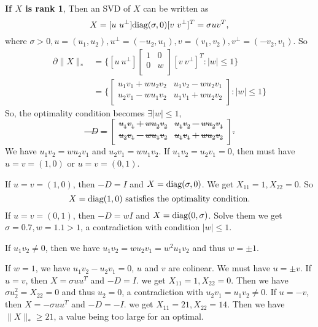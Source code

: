 \textbf{If $X$ is rank 1},
Then an SVD of $X$ can be written as
\begin{equation}
    X=[u\ u^\perp] {\text{diag}}(\sigma,0) [v\ v^\perp]^T = \sigma uv^T,
\end{equation}
where $\sigma>0, u=(u_1,u_2), u^\perp=(-u_2,u_1), v=(v_1,v_2), v^\perp=(-v_2,v_1)$.
So
\begin{equation}
\begin{split}
    \partial\|X\|_*
        &=\bigg\{[u\ u^\perp]
            \begin{bmatrix}
                1 & 0    \\
                0 & w \\
            \end{bmatrix}
            [v\ v^\perp]^T:|w|\le1\bigg\} \\
        &=\bigg\{
            \begin{bmatrix}
                u_1v_1+wu_2v_2 & u_1v_2-wu_2v_1 \\
                u_2v_1-wu_1v_2 & u_1v_1+wu_2v_2 \\
            \end{bmatrix}
            :|w|\le1\bigg\}
\end{split}
\end{equation}
So, the optimality condition becomes $\exists |w|\le1$, \st
\begin{equation}
    -D=\begin{bmatrix}
            u_1v_1+wu_2v_2 & u_1v_2-wu_2v_1 \\
            u_2v_1-wu_1v_2 & u_1v_1+wu_2v_2 \\
        \end{bmatrix}.
\end{equation}
We have $u_1v_2=wu_2v_1$ and $u_2v_1=wu_1v_2$.
If $u_1v_2=u_2v_1=0$,
then must have $u=v=(1,0)$ or $u=v=(0,1)$.

If $u=v=(1,0)$,
then $-D=I$ and $X={\text{diag}}(\sigma,0)$.
We get $X_{11}=1,X_{22}=0$.
So
\begin{equation}
    X={\text{diag}}(1,0) \text{ satisfies the optimality condition}.
\end{equation}
If $u=v=(0,1)$,
then $-D=wI$ and $X={\text{diag}}(0,\sigma)$.
Solve them we get $\sigma=0.7, w=1.1>1$,
a contradiction with condition $|w|\le1$.

If $u_1v_2\ne0$,
then we have $u_1v_2=wu_2v_1=w^2u_1v_2$
and thus $w=\pm1$.

If $w=1$,
we have $u_1v_2-u_2v_1=0$,
\ie $u$ and $v$ are colinear.
We must have $u=\pm v$.
If $u=v$,
then $X=\sigma uu^T$ and $-D=I$.
we get $X_{11}=1, X_{22}=0$.
Then we have $\sigma u_2^2=X_{22}=0$
and thus $u_2=0$,
a contradiction with $u_2v_1=u_1v_2\ne0$.
If $u=-v$,
then $X=-\sigma uu^T$ and $-D=-I$.
we get $X_{11}=21, X_{22}=14$.
Then we have $\|X\|_*\ge21$,
a value being too large for an optimal.


